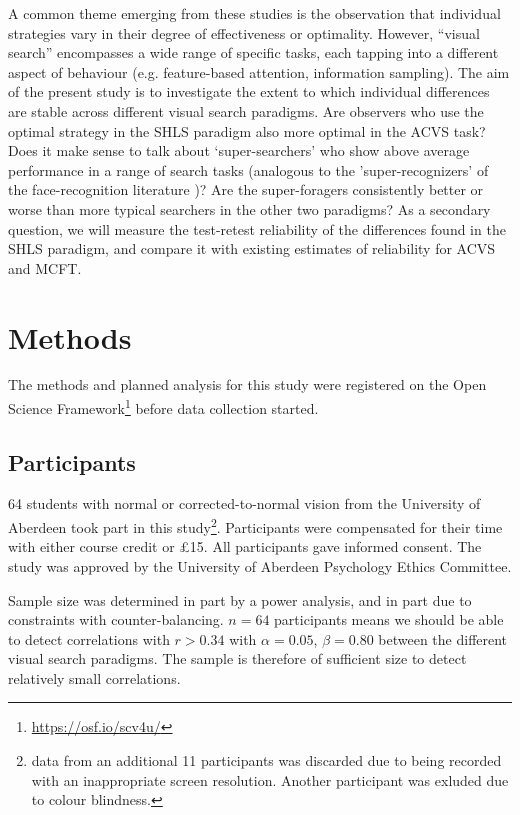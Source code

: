 \documentclass[twocolumn]{article}
\begin{document}
A common theme emerging from these studies is the observation that individual strategies vary in their degree of effectiveness or optimality. However, ``visual search'' encompasses a wide range of specific tasks, each tapping into a different aspect of behaviour (e.g. feature-based attention, information sampling). The aim of the present study is to investigate the extent to which individual differences are stable across different visual search paradigms. Are observers who use the optimal strategy in the SHLS paradigm also more optimal in the ACVS task? Does it make sense to talk about `super-searchers' who show above average performance in a range of search tasks (analogous to the 'super-recognizers' of the face-recognition literature \cite{russell2009})? Are the super-foragers consistently better or worse than more typical searchers in the other two paradigms? As a secondary question, we will measure the test-retest reliability of the differences found in the SHLS paradigm, and compare it with existing estimates of reliability for ACVS and MCFT. 

\section{Methods}

The methods and planned analysis for this study were registered on the Open Science Framework\footnote{\url{https://osf.io/scv4u/}} before data collection started.

\subsection{Participants}
64 students with normal or corrected-to-normal vision from the University of Aberdeen took part in this study\footnote{data from an additional 11 participants was discarded due to being recorded with an inappropriate screen resolution. Another participant was exluded due to colour blindness.}. Participants were compensated for their time with either  course credit or \pounds 15. All participants gave informed consent. The study was approved by the University of Aberdeen Psychology Ethics Committee. 

Sample size was determined in part by a power analysis, and in part due to constraints with counter-balancing. $n = 64$ participants means we should be able to detect correlations with $r > 0.34$ with $\alpha = 0.05$, $\beta = 0.80$ between the different visual search paradigms. The sample is therefore of sufficient size to detect relatively small correlations.
\end{document}
